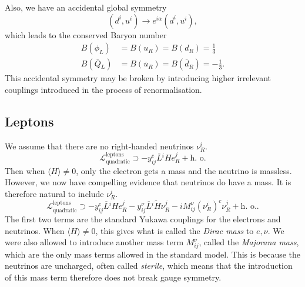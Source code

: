 Also, we have an accidental global symmetry 
\begin{equation}
  (d^i, u^i) \to e^{i \alpha} (d^i, u^i),
\end{equation}
which leads to the conserved Baryon number
\begin{align}
  B(\phi_L) &= B(u_R) = B(d_R) = \frac{1}{3} \\
  B(\overline{Q}{}_L) &= B(\overline{u}{}_R) = B(\overline{d}{}_R) = -\frac{1}{3}.
\end{align}
This accidental symmetry may be broken by introducing higher irrelevant couplings introduced in the process of renormalisation.

\subsection*{Leptons}%

We assume that there are no right-handed neutrinos $\nu^{i}_R$. 
\begin{equation}
  \mathscr{L}_{\text{quadratic}}^{\text{leptons}} \supset - y_{ij}^{e} \overline{L}{}^{i} H e^{j}_{R} + \text{h.~o.}
\end{equation}
Then when $\langle H \rangle \neq 0$, only the electron gets a mass and the neutrino is massless.
However, we now have compelling evidence that neutrinos do have a mass. It is therefore natural to include $\nu^{i}_R$. 
\begin{equation}
  \mathscr{L}_{\text{quadratic}}^{\text{leptons}} \supset - y^{e}_{ij} \overline{L}{}^{i} H e^{j}_{R} - y^\nu_{ij} \overline{L}{}^{i} \widetilde{H} \nu_R^{j} - i M^{\nu}_{ij} (\nu^{i}_{R})^{c} \nu^{j}_{R} + \text{h.~o.}.
\end{equation}
The first two terms are the standard Yukawa couplings for the electrons and neutrinos.
When $\langle H \rangle \neq 0$, this gives what is called the \emph{Dirac mass} to $e, \nu$.
We were also allowed to introduce another mass term $M^{\nu}_{ij}$, called the \emph{Majorana mass}, which are the only mass terms allowed in the standard model. This is because the neutrinos are uncharged, often called \emph{sterile}, which means that the introduction of this mass term therefore does not break gauge symmetry.

